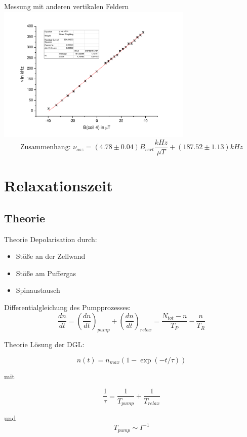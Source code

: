 \documentclass{beamer}
\begin{document}
\begin{frame}{Messung mit anderen vertikalen Feldern}
\centering \includegraphics[width=0.7\textwidth]{Bilder/praezfeld.pdf}
$$\text{Zusammenhang: } \nu_{osz} = (4.78\pm0.04)B_{vert} \frac{kHz}{\mu T} + (187.52 \pm 1.13)kHz$$
\end{frame}

\section{Relaxationszeit}
\begin{frame}
\begin{center}
\end{center}
\end{frame}

\subsection{Theorie}
\begin{frame}{Theorie}
Depolarisation durch:
\begin{itemize}
\item Stöße an der Zellwand
\item Stöße am Puffergas
\item Spinaustausch
\end{itemize}

Differentialgleichung des Pumpprozesses:
 $$\frac{dn}{dt} = \left(\frac{dn}{dt}\right)_{pump} + \left(\frac{dn}{dt}\right)_{relax} = \frac{N_{tot}-n}{T_P} - \frac{n}{T_R}$$ %
\end{frame}

\begin{frame}{Theorie}
Lösung der DGL:

$$n(t) = n_{max}(1-\exp(-t/\tau))$$

mit

$$\frac{1}{\tau} = \frac{1}{T_{pump}} + \frac{1}{T_{relax}}$$ %

und $$T_{pump} \sim I^{-1}$$ %

\end{frame}
\end{document}
